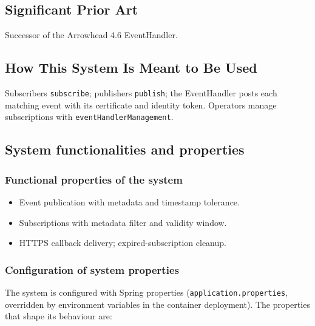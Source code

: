 \documentclass[a4paper]{arrowhead}
\begin{document}
\newpage

\subsection{Significant Prior Art}
\label{sec:prior_art}

Successor of the Arrowhead 4.6 EventHandler.

\subsection{How This System Is Meant to Be Used}
\label{sec:use}

Subscribers \texttt{subscribe}; publishers \texttt{publish}; the EventHandler posts each matching event with its certificate and identity token. Operators manage subscriptions with \texttt{event\allowbreak{}Handler\allowbreak{}Management}.

\subsection{System functionalities and properties}
\label{sec:properties}

\subsubsection{Functional properties of the system}

\begin{itemize}
  \item Event publication with metadata and timestamp tolerance.
  \item Subscriptions with metadata filter and validity window.
  \item HTTPS callback delivery; expired-subscription cleanup.
\end{itemize}

\subsubsection{Configuration of system properties}

The system is configured with Spring properties (\texttt{application.properties}, overridden by environment variables in the container deployment). The properties that shape its behaviour are:
\end{document}
